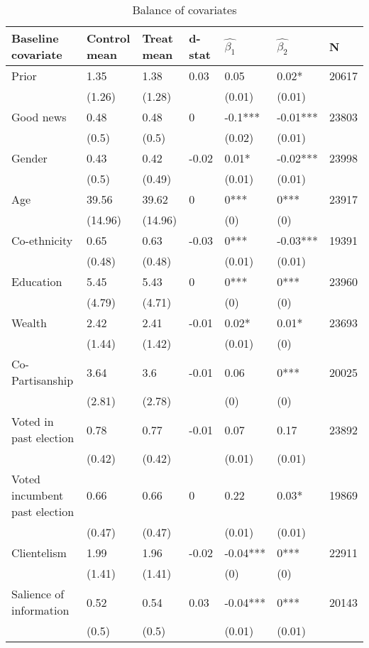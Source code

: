 \documentclass[]{article}
\begin{document}
\begin{table}[htb]
\caption{Balance of covariates}
\centering
\begin{tabular}{lllllll}
  \hline
Baseline covariate & Control mean  & Treat mean & d-stat & $\hat{\beta_1}$ & $\hat{\beta_2}$ & N \\ 
  \hline
Prior & 1.35 & 1.38 & 0.03 & 0.05 & 0.02* & 20617 \\ 
   & (1.26) & (1.28) &  & (0.01) & (0.01) &  \\ 
  Good news & 0.48 & 0.48 & 0 & -0.1*** & -0.01*** & 23803 \\ 
   & (0.5) & (0.5) &  & (0.02) & (0.01) &  \\ 
  Gender & 0.43 & 0.42 & -0.02 & 0.01* & -0.02*** & 23998 \\ 
   & (0.5) & (0.49) &  & (0.01) & (0.01) &  \\ 
  Age & 39.56 & 39.62 & 0 & 0*** & 0*** & 23917 \\ 
   & (14.96) & (14.96) &  & (0) & (0) &  \\ 
  Co-ethnicity & 0.65 & 0.63 & -0.03 & 0*** & -0.03*** & 19391 \\ 
   & (0.48) & (0.48) &  & (0.01) & (0.01) &  \\ 
  Education & 5.45 & 5.43 & 0 & 0*** & 0*** & 23960 \\ 
   & (4.79) & (4.71) &  & (0) & (0) &  \\ 
  Wealth & 2.42 & 2.41 & -0.01 & 0.02* & 0.01* & 23693 \\ 
   & (1.44) & (1.42) &  & (0.01) & (0) &  \\ 
  Co-Partisanship & 3.64 & 3.6 & -0.01 & 0.06 & 0*** & 20025 \\ 
   & (2.81) & (2.78) &  & (0) & (0) &  \\ 
  Voted in past election & 0.78 & 0.77 & -0.01 & 0.07 & 0.17 & 23892 \\ 
   & (0.42) & (0.42) &  & (0.01) & (0.01) &  \\ 
  Voted incumbent past election & 0.66 & 0.66 & 0 & 0.22 & 0.03* & 19869 \\ 
   & (0.47) & (0.47) &  & (0.01) & (0.01) &  \\ 
  Clientelism & 1.99 & 1.96 & -0.02 & -0.04*** & 0*** & 22911 \\ 
   & (1.41) & (1.41) &  & (0) & (0) &  \\ 
  Salience of information & 0.52 & 0.54 & 0.03 & -0.04*** & 0*** & 20143 \\ 
   & (0.5) & (0.5) &  & (0.01) & (0.01) &  \\ 

\end{tabular}
\end{table}
\end{document}
